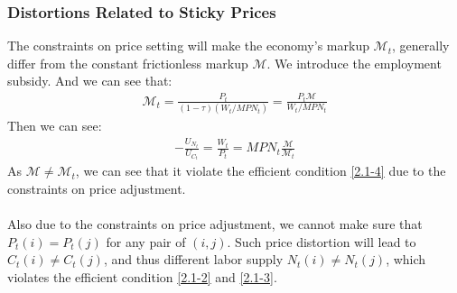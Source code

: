 \documentclass{article}
\numberwithin{equation}{section}
\begin{document}
\subsubsection{Distortions Related to Sticky Prices}
The constraints on price setting will make the economy's markup $\mathscr{M}_t$, generally differ from the constant frictionless markup $\mathscr{M}$. We introduce the employment subsidy. And we can see that:
	\begin{align*}
		\mathscr{M}_t = \frac{P_t}{(1 - \tau)(W_t/MPN_t)} = \frac{P_t \mathscr{M}}{W_t/MPN_t}
	\end{align*}
Then we can see:
	\begin{align*}
		-\frac{U_{N_t}}{U_{C_t}} = \frac{W_t}{P_t} = MPN_t \frac{\mathscr{M}}{\mathscr{M}_t}
	\end{align*}
As $\mathscr{M} \neq \mathscr{M}_t$, we can see that it violate the efficient condition \eqref{2.1-4} due to the constraints on price adjustment.\\\\
Also due to the constraints on price adjustment, we cannot make sure that $P_t(i) = P_t(j)$ for any pair of $(i, j)$. Such price distortion will lead to $C_t(i) \neq C_t(j)$, and thus different labor supply $N_t(i) \neq N_t(j)$, which violates the efficient condition \eqref{2.1-2} and \eqref{2.1-3}.
\end{document}
